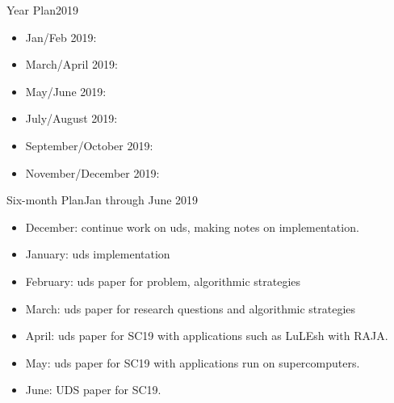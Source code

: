 \begin{frame}{Year Plan}{2019}
\begin{itemize} 
\item Jan/Feb 2019:
\item March/April 2019: 
\item May/June 2019:
\item July/August 2019: 
\item September/October 2019: 
\item November/December 2019:
\end{itemize}
\end{frame}

\begin{frame}{Six-month Plan}{Jan through June 2019}
\begin{itemize}
\item December: continue work on uds, making notes on implementation. 
\item January: uds implementation 
\item February: uds paper for problem, algorithmic strategies 
\item March: uds paper for research questions and algorithmic strategies 
\item April: uds paper for SC19 with applications such as LuLEsh with RAJA. 
\item May: uds paper for SC19 with applications run on supercomputers. 
\item June: UDS paper for SC19. 
\end{itemize}
\end{frame}

